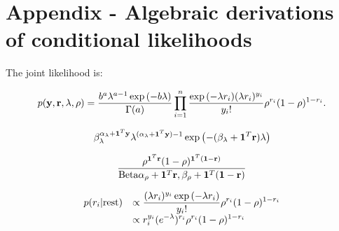 \documentclass[11pt]{amsart}
\begin{document}
\section{Appendix - Algebraic derivations of conditional likelihoods}

The joint likelihood is:

$$
p({\bf y}, {\bf r}, \lambda, \rho) = \frac{b^a \lambda^{a - 1} \exp{(-b \lambda)}}{\Gamma{(a)}} \prod_{i=1}^n \frac{\exp{(-\lambda r_i)} (\lambda r_i)^{y_i}}{y_i !} \rho^{r_i} (1 - \rho)^{1 - r_i}.
$$

%
%
%


$$
\beta_{\lambda}^{\alpha_\lambda+{\bf 1}^T{\bf y}} \lambda^{(\alpha_\lambda + {\bf 1}^T{\bf y}) - 1} \exp{\left(-(\beta_\lambda + {\bf1}^T{\bf r}) \lambda \right)}
$$

$$
\frac{\rho^{{\bf 1}^T{\bf r}} (1 - \rho)^{{\bf 1}^T({\bf 1} - {\bf r})}}{\text{Beta}{\alpha_\rho + {\bf1}^T {\bf r}, \beta_\rho + {\bf1}^T({\bf1}- {\bf r})}}
$$

$$
\begin{array}{ll}
	p(r_i | \text{rest}) & \displaystyle \propto \frac{(\lambda r_i)^{y_i} \exp{(-\lambda r_i)}}{y_i !} \rho^{r_i} (1 - \rho)^{1 - r_i} \\
	                     & \displaystyle \propto r_i^{y_i} (e^{-\lambda})^{r_i} \rho^{r_i} (1 - \rho)^{1 - r_i}                         
\end{array}
$$
\end{document}
